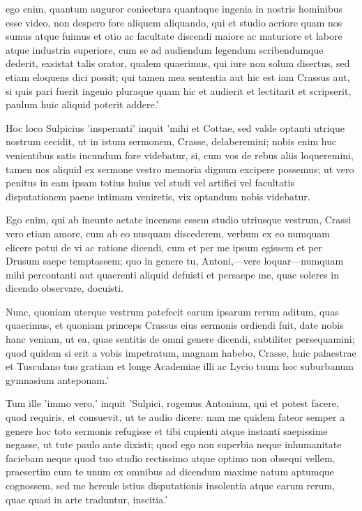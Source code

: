  ego enim, quantum auguror coniectura quantaque ingenia in nostris hominibus esse video, non despero fore aliquem aliquando, qui et studio acriore quam nos sumus atque fuimus et otio ac facultate discendi maiore ac maturiore et labore atque industria superiore, cum se ad audiendum legendum scribendumque dederit, exsistat talis orator, qualem quaerimus, qui iure non solum disertus, sed etiam eloquens dici possit; qui tamen mea sententia aut hic est iam Crassus aut, si quis pari fuerit ingenio pluraque quam hic et audierit et lectitarit et scripserit, paulum huic aliquid poterit addere.'

 Hoc loco Sulpicius 'insperanti' inquit 'mihi et Cottae, sed valde optanti utrique nostrum cecidit, ut in istum sermonem, Crasse, delaberemini; nobis enim huc venientibus satis iucundum fore videbatur, si, cum vos de rebus aliis loqueremini, tamen nos aliquid ex sermone vestro memoria dignum excipere possemus; ut vero penitus in eam ipsam totius huius vel studi vel artifici vel facultatis disputationem paene intimam veniretis, vix optandum nobis videbatur.

 Ego enim, qui ab ineunte aetate incensus essem studio utriusque vestrum, Crassi vero etiam amore, cum ab eo nusquam discederem, verbum ex eo numquam elicere potui de vi ac ratione dicendi, cum et per me ipsum egissem et per Drusum saepe temptassem; quo in genere tu, Antoni,—vere loquar—numquam mihi percontanti aut quaerenti aliquid defuisti et persaepe me, quae soleres in dicendo observare, docuisti.

 Nunc, quoniam uterque vestrum patefecit earum ipsarum rerum aditum, quas quaerimus, et quoniam princeps Crassus eius sermonis ordiendi fuit, date nobis hanc veniam, ut ea, quae sentitis de omni genere dicendi, subtiliter persequamini; quod quidem si erit a vobis impetratum, magnam habebo, Crasse, huic palaestrae et Tusculano tuo gratiam et longe Academiae illi ac Lycio tuum hoc suburbanum gymnasium anteponam.'

 Tum ille 'immo vero,' inquit 'Sulpici, rogemus Antonium, qui et potest facere, quod requiris, et consuevit, ut te audio dicere: nam me quidem fateor semper a genere hoc toto sermonis refugisse et tibi cupienti atque instanti saepissime negasse, ut tute paulo ante dixisti; quod ego non superbia neque inhumanitate faciebam neque quod tuo studio rectissimo atque optimo non obsequi vellem, praesertim cum te unum ex omnibus ad dicendum maxime natum aptumque cognossem, sed me hercule istius disputationis insolentia atque earum rerum, quae quasi in arte traduntur, inscitia.'

